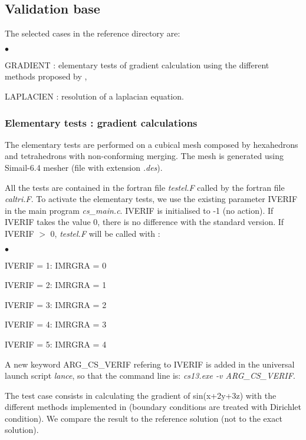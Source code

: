 \subsection{Validation base}

The selected cases in the reference directory are:
\begin{list}{$\bullet$}{}
\item GRADIENT : elementary tests of gradient calculation using the
      different methods proposed by \CS,
\item LAPLACIEN : resolution of a laplacian equation.
\end{list}

\subsubsection{Elementary tests : gradient calculations}
The elementary tests are performed on a cubical mesh composed by
hexahedrons and tetrahedrons with non-conforming merging. The mesh is
generated using Simail-6.4 mesher (file with extension {\it .des}).

All the tests are contained in the fortran file {\it testel.F} called by
the fortran file {\it caltri.F}. To activate the elementary tests,
we use the existing parameter IVERIF in the main program {\it
cs\_main.c}. IVERIF is initialised to -1 (no action). If IVERIF takes
the value 0, there is no difference with the standard version. If
IVERIF $>$ 0, {\it testel.F} will be called with :
\begin{list}{$\bullet$}{}
\item IVERIF = 1: IMRGRA = 0
\item IVERIF = 2: IMRGRA = 1
\item IVERIF = 3: IMRGRA = 2
\item IVERIF = 4: IMRGRA = 3
\item IVERIF = 5: IMRGRA = 4
\end{list}

A new keyword ARG\_CS\_VERIF refering to IVERIF is added in the
universal launch script {\it lance}, so that the command line is:
{\it cs13.exe -v ARG\_CS\_VERIF}.

The test case consists in calculating the gradient of sin(x+2y+3z)
with the different methods implemented in \CS (boundary conditions
are treated with Dirichlet condition). We compare the result to the
reference solution (not to the exact solution).


